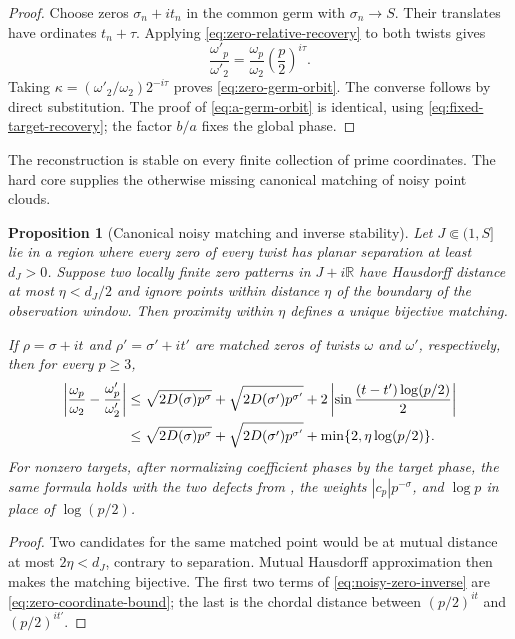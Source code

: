 \documentclass[11pt]{article}
\newtheorem{proposition}[theorem]{Proposition}
\theoremstyle{definition}
\theoremstyle{remark}
\newcommand{\R}{\mathbb R}
\begin{document}
\begin{proof}
Choose zeros $\sigma_n+it_n$ in the common germ with
$\sigma_n\to S$.  Their translates have ordinates $t_n+\tau$.
Applying \eqref{eq:zero-relative-recovery} to both twists gives
\[
 \frac{\omega'_p}{\omega'_2}
 =\frac{\omega_p}{\omega_2}
  \left(\frac p2\right)^{i\tau}.
\]
Taking $\kappa=(\omega'_2/\omega_2)2^{-i\tau}$ proves
\eqref{eq:zero-germ-orbit}.  The converse follows by direct
substitution.  The proof of \eqref{eq:a-germ-orbit} is identical, using
\eqref{eq:fixed-target-recovery}; the factor $b/a$ fixes the global
phase.
\end{proof}

The reconstruction is stable on every finite collection of prime
coordinates.  The hard core supplies the otherwise missing canonical
matching of noisy point clouds.

\begin{proposition}[Canonical noisy matching and inverse stability]
\label{prop:noisy-phase-stability}
Let $J\Subset(1,S]$ lie in a region where every zero of every twist has
planar separation at least $d_J>0$.  Suppose two locally finite zero
patterns in $J+i\R$ have Hausdorff distance at most $\eta<d_J/2$ and
ignore points within distance $\eta$ of the boundary of the observation
window.  Then proximity within $\eta$ defines a unique bijective
matching.

If $\rho=\sigma+it$ and $\rho'=\sigma'+it'$ are matched zeros of twists
$\omega$ and $\omega'$, respectively, then for every $p\ge3$,
\begin{align}
 \left|\frac{\omega_p}{\omega_2}
       -\frac{\omega'_p}{\omega'_2}\right|
 &\le \sqrt{2D(\sigma)p^\sigma}
      +\sqrt{2D(\sigma')p^{\sigma'}}
      +2\left|\sin\frac{(t-t')\log(p/2)}2\right|             \notag\\
 &\le \sqrt{2D(\sigma)p^\sigma}
      +\sqrt{2D(\sigma')p^{\sigma'}}
      +\min\{2,\eta\log(p/2)\}.
 \label{eq:noisy-zero-inverse}
\end{align}
For nonzero targets, after normalizing coefficient phases by the target
phase, the same formula holds with the two defects from
, the weights $|c_p|p^{-\sigma}$, and
$\log p$ in place of $\log(p/2)$.
\end{proposition}

\begin{proof}
Two candidates for the same matched point would be at mutual distance
at most $2\eta<d_J$, contrary to separation.  Mutual Hausdorff
approximation then makes the matching bijective.  The first two terms of
\eqref{eq:noisy-zero-inverse} are
\eqref{eq:zero-coordinate-bound}; the last is the chordal distance
between $(p/2)^{it}$ and $(p/2)^{it'}$.
\end{proof}
\end{document}
